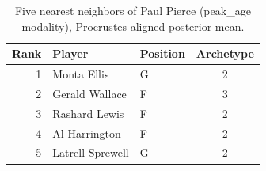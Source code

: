 \begin{table}[htbp]
  \centering\small
  \begin{tabular}{rllc}
    \toprule
    Rank & Player & Position & Archetype \\
    \midrule
    1 & Monta Ellis & G & 2 \\
    2 & Gerald Wallace & F & 3 \\
    3 & Rashard Lewis & F & 2 \\
    4 & Al Harrington & F & 2 \\
    5 & Latrell Sprewell & G & 2 \\
    \bottomrule
  \end{tabular}
  \caption{Five nearest neighbors of Paul Pierce (peak_age modality), Procrustes-aligned posterior mean.}
  \label{tab:Paul_Pierce_neighbors_peak_age}
\end{table}

